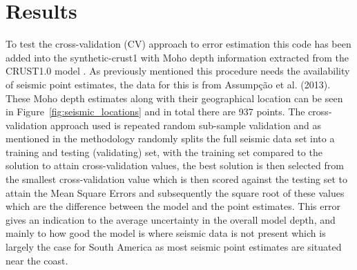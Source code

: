 \chapter{Results}

To test the cross-validation (CV) approach to error estimation this code has been added into the \cite{Uieda2016} synthetic-crust1 with Moho depth information extracted from the CRUST1.0 model \citep{Laske2013}. As previously mentioned this procedure needs the availability of seismic point estimates, the data for this is from Assumpção et al. (2013). These Moho depth estimates along with their geographical location can be seen in Figure~\ref{fig:seismic_locations} and in total there are 937 points.
The cross-validation approach used is repeated random sub-sample validation and as mentioned in the methodology randomly splits the full seismic data set into a training and testing (validating) set, with the training set compared to the solution to attain cross-validation values, the best solution is then selected from the smallest cross-validation value which is then scored against the testing set to attain the Mean Square Errors and subsequently the square root of these values which are the difference between the model and the point estimates. This error gives an indication to the average uncertainty in the overall model depth, and mainly to how good the model is where seismic data is not present which is largely the case for South America as most seismic point estimates are situated near the coast.
